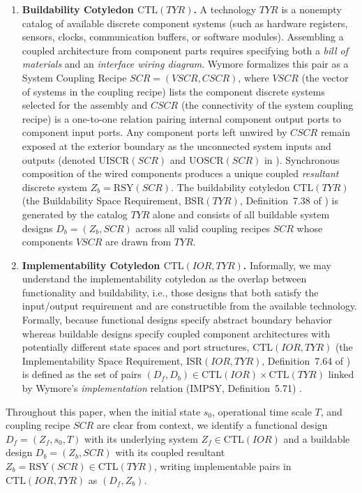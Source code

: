 \begin{enumerate}
    \item \textbf{Buildability Cotyledon $\mathrm{CTL}(TYR)$.} A technology $TYR$ is a nonempty catalog of available discrete component systems (such as hardware registers, sensors, clocks, communication buffers, or software modules). Assembling a coupled architecture from component parts requires specifying both a \emph{bill of materials} and an \emph{interface wiring diagram}. Wymore formalizes this pair as a System Coupling Recipe $SCR=(VSCR,CSCR)$, where $VSCR$ (the vector of systems in the coupling recipe) lists the component discrete systems selected for the assembly and $CSCR$ (the connectivity of the system coupling recipe) is a one-to-one relation pairing internal component output ports to component input ports. Any component ports left unwired by $CSCR$ remain exposed at the exterior boundary as the unconnected system inputs and outputs (denoted $\mathrm{UISCR}(SCR)$ and $\mathrm{UOSCR}(SCR)$ in \citet{Wymore1993}). Synchronous composition of the wired components produces a unique coupled \emph{resultant} discrete system $Z_b=\mathrm{RSY}(SCR)$. The buildability cotyledon $\mathrm{CTL}(TYR)$ (the Buildability Space Requirement, $\mathrm{BSR}(TYR)$, Definition~7.38 of \citet{Wymore1993}) is generated by the catalog $TYR$ alone and consists of all buildable system designs $D_b=(Z_b,SCR)$ across all valid coupling recipes $SCR$ whose components $VSCR$ are drawn from $TYR$.
    \item \textbf{Implementability Cotyledon $\mathrm{CTL}(IOR,TYR)$.} Informally, we may understand the implementability cotyledon as the overlap between functionality and buildability, i.e., those designs that both satisfy the input/output requirement and are constructible from the available technology. Formally, because functional designs specify abstract boundary behavior whereas buildable designs specify coupled component architectures with potentially different state spaces and port structures, $\mathrm{CTL}(IOR,TYR)$ (the Implementability Space Requirement, $\mathrm{ISR}(IOR,TYR)$, Definition~7.64 of \citet{Wymore1993}) is defined as the set of pairs $(D_f,D_b)\in\mathrm{CTL}(IOR)\times\mathrm{CTL}(TYR)$ linked by Wymore's \emph{implementation} relation ($\mathrm{IMPSY}$, Definition~5.71) \citep{Wymore1993}.
\end{enumerate}
Throughout this paper, when the initial state $s_0$, operational time scale $T$, and coupling recipe $SCR$ are clear from context, we identify a functional design $D_f=(Z_f,s_0,T)$ with its underlying system $Z_f\in\mathrm{CTL}(IOR)$ and a buildable design $D_b=(Z_b,SCR)$ with its coupled resultant $Z_b=\mathrm{RSY}(SCR)\in\mathrm{CTL}(TYR)$, writing implementable pairs in $\mathrm{CTL}(IOR,TYR)$ as $(D_f,Z_b)$.

